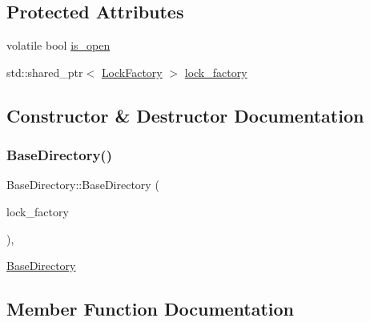 \subsection*{Protected Attributes}
\begin{DoxyCompactItemize}
\item 
volatile bool \mbox{\hyperlink{classlucene_1_1core_1_1store_1_1BaseDirectory_aa05ba27e4262493ec57cabd5ed0f330a}{is\+\_\+open}}
\item 
std\+::shared\+\_\+ptr$<$ \mbox{\hyperlink{classlucene_1_1core_1_1store_1_1LockFactory}{Lock\+Factory}} $>$ \mbox{\hyperlink{classlucene_1_1core_1_1store_1_1BaseDirectory_a61e759bb8ca8ec591d2a067679164f3a}{lock\+\_\+factory}}
\end{DoxyCompactItemize}


\subsection{Constructor \& Destructor Documentation}
\mbox{\label{classlucene_1_1core_1_1store_1_1BaseDirectory_a94a76ba3222363ddb6f2457e88c9fa28}} 
\subsubsection{\texorpdfstring{Base\+Directory()}{BaseDirectory()}}
{\footnotesize\ttfamily Base\+Directory\+::\+Base\+Directory (\begin{DoxyParamCaption}\item[{\mbox{\hyperlink{ZlibCrc32_8h_a2c212835823e3c54a8ab6d95c652660e}{const}} std\+::shared\+\_\+ptr$<$ \mbox{\hyperlink{classlucene_1_1core_1_1store_1_1LockFactory}{Lock\+Factory}} $>$ \&}]{lock\+\_\+factory }\end{DoxyParamCaption})\hspace{0.3cm}{\ttfamily [explicit]}, {\ttfamily [protected]}}

\mbox{\hyperlink{classlucene_1_1core_1_1store_1_1BaseDirectory}{Base\+Directory}} 

\subsection{Member Function Documentation}
\mbox{\label{classlucene_1_1core_1_1store_1_1BaseDirectory_ae98262cc7ef9b3285ffe789eaa72e82a}} 
